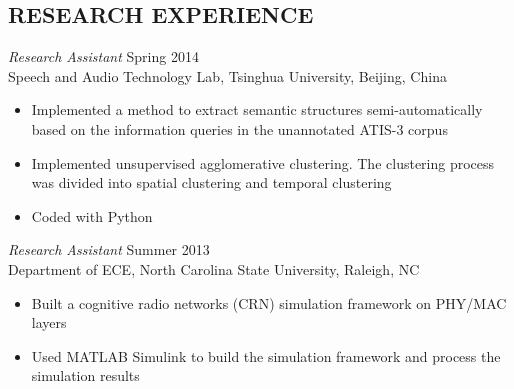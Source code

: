 \documentclass[margin, 10pt]{res} %
\begin{document}
\begin{resume}

\section{RESEARCH EXPERIENCE}



{\sl Research Assistant} \hfill Spring 2014 \\
Speech and Audio Technology Lab, Tsinghua University, Beijing, China
\begin{itemize} \itemsep -2pt
\item Implemented a method to extract semantic structures semi-automatically based on the information queries in the unannotated ATIS-3 corpus
\item Implemented unsupervised agglomerative clustering. The clustering process was divided into spatial clustering and temporal clustering
\item Coded with Python
\end{itemize}

{\sl Research Assistant} \hfill Summer 2013 \\
Department of ECE, North Carolina State University, Raleigh, NC
\begin{itemize} \itemsep -2pt
\item Built a cognitive radio networks (CRN) simulation framework
on PHY/MAC layers
\item Used MATLAB Simulink to build the simulation framework and process the simulation results
\end{itemize}


\end{resume}
\end{document}
